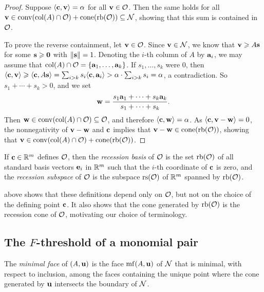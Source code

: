 \documentclass{amsart}
\begin{document}
\begin{proof}
   Suppose $\langle \mathbf{c}, \mathbf{v} \rangle = \alpha$ for all $\mathbf{v} \in \mathcal{O}$.
   Then the same holds for all $\mathbf{v} \in\operatorname{conv}( \operatorname{col}(A) \cap \mathcal{O} ) + \operatorname{cone}(\operatorname{rb}(\mathcal{O})) \subseteq \mathcal{N}$, showing that this sum is contained in  $\mathcal{O}$.

   To prove the reverse containment, let $\mathbf{v} \in \mathcal{O}$.
   Since $\mathbf{v} \in \mathcal{N}$, we know that $\mathbf{v} \geqslant A \mathbf{s}$ for some $\mathbf{s}\geqslant \mathbf{0}$ with $\| \mathbf{s} \| = 1$.
   Denoting the $i$-th column of $A$ by $\mathbf{a}_i$, we may assume that $\operatorname{col}(A) \cap \mathcal{O} = \{\mathbf{a}_1,\ldots,\mathbf{a}_k\}$.
   If $s_1, \ldots, s_k$ were  $0$, then $\langle \mathbf{c}, \mathbf{v} \rangle \geqslant \langle \mathbf{c}, A\mathbf{s} \rangle = \sum_{i>k} s_i \langle \mathbf{c}, \mathbf{a}_i \rangle> \alpha \cdot \sum_{i>k} s_i  =\alpha$, a contradiction.
   So $s_1+\cdots+s_k >0$, and we set
   \[\mathbf{w} = \frac{s_1\mathbf{a}_1+\cdots+s_k\mathbf{a}_k}{s_1+\cdots+s_k}.\]
   Then $\mathbf{w} \in \operatorname{conv}(\operatorname{col}(A)\cap \mathcal{O}) \subseteq \mathcal{O}$, and therefore $\langle \mathbf{c}, \mathbf{w} \rangle = \alpha$.
   As $\langle \mathbf{c}, \mathbf{v}-\mathbf{w} \rangle = 0$, the nonnegativity of $\mathbf{v} - \mathbf{w}$ and $\mathbf{c}$ implies that $\mathbf{v} - \mathbf{w} \in \operatorname{cone}(\operatorname{rb}(\mathcal{O}))$, showing that $\mathbf{v} \in \operatorname{conv}( \operatorname{col}(A) \cap \mathcal{O} ) + \operatorname{cone}(\operatorname{rb}(\mathcal{O}))$.
\end{proof}

\begin{definition}
   If $\mathbf{c} \in \mathbb{R}^m$ defines $\mathcal{O}$, then the \emph{recession basis} of $\mathcal{O}$ is the set $\operatorname{rb}(\mathcal{O})$ of all standard basis vectors $\mathbf{e}_i$ in $\mathbb{R}^m$ such that the $i$-th coordinate of $\mathbf{c}$ is zero, and the \emph{recession subspace} of $\mathcal{O}$ is the subspace $\operatorname{rs}(\mathcal{O})$ of $\mathbb{R}^m$ spanned by $\operatorname{rb}(\mathcal{O})$.
\end{definition}

 above shows that these definitions depend only on $\mathcal{O}$, but not on the choice of the defining point $\mathbf{c}$.
It also shows that the cone generated by $\operatorname{rb}(\mathcal{O})$ is the recession cone of $\mathcal{O}$, motivating our choice of terminology.

\subsection{The $F$-threshold of a monomial pair}

\begin{definition}
   The \emph{minimal face} of $(A, \mathbf{u})$ is the face $\operatorname{mf}(A, \mathbf{u})$ of $\mathcal{N}$ that is minimal, with respect to inclusion, among the faces containing the unique point where the cone generated by $\mathbf{u}$ intersects the boundary of $\mathcal{N}$.
\end{definition}
\end{document}
